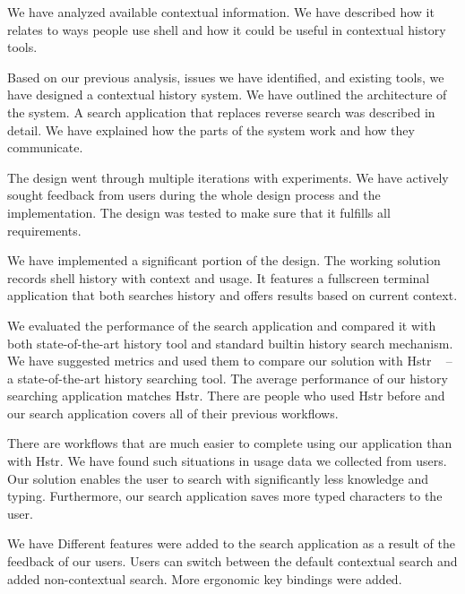 \documentclass[thesis=M,english]{FITthesis}[2012/10/20]
\let\myCite\cite
\renewcommand\cite{\unskip~\myCite}
\begin{document}
\begin{conclusion}
We have analyzed available contextual information. We have described how it relates to ways people use shell and how it could be useful in contextual history tools. 


Based on our previous analysis, issues we have identified, and existing tools, we have designed a contextual history system. We have outlined the architecture of the system. A search application that replaces reverse search was described in detail. We have explained how the parts of the system work and how they communicate. 

The design went through multiple iterations with experiments.
We have actively sought feedback from users during the whole design process and the implementation. The design was tested to make sure that it fulfills all requirements. 


We have implemented a significant portion of the design. The working solution records shell history with context and usage. It features a fullscreen terminal application that both searches history and offers results based on current context. 


We evaluated the performance of the search application and compared it with both state-of-the-art history tool and standard builtin history search mechanism.
We have suggested metrics and used them to compare our solution with Hstr \cite{toolshstr} -- a state-of-the-art history searching tool.
The average performance of our history searching application matches Hstr. There are people who used Hstr before and our search application covers all of their previous workflows.


There are workflows that are much easier to complete using our application than with Hstr. We have found such situations in usage data we collected from users.
Our solution enables the user to search with significantly less knowledge and typing. Furthermore, our search application saves more typed characters to the user. 

We have 
Different features were added to the search application as a result of the feedback of our users. Users can switch between the default contextual search and added non-contextual search. More ergonomic key bindings were added.


\end{conclusion}
\end{document}

